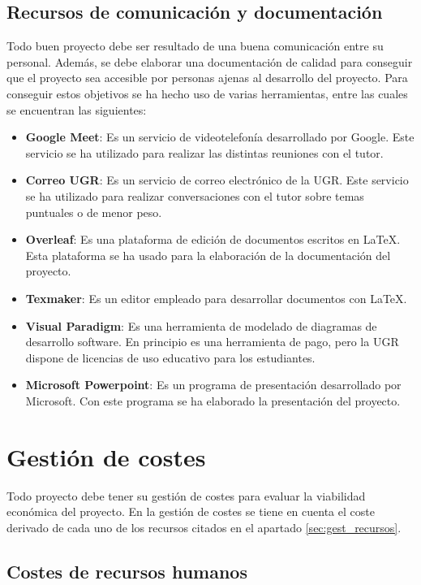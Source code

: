 \subsection{Recursos de comunicación y documentación} \label{subsec:recur_comu_docu}

Todo buen proyecto debe ser resultado de una buena comunicación entre su personal. Además, se debe elaborar una documentación de calidad para conseguir que el proyecto sea accesible por personas ajenas al desarrollo del proyecto. Para conseguir estos objetivos se ha hecho uso de varias herramientas, entre las cuales se encuentran las siguientes:

\begin{itemize}
\item \textbf{Google Meet}: Es un servicio de videotelefonía desarrollado por Google. Este servicio se ha utilizado para realizar las distintas reuniones con el tutor.
\item \textbf{Correo UGR}: Es un servicio de correo electrónico de la UGR. Este servicio se ha utilizado para realizar conversaciones con el tutor sobre temas puntuales o de menor peso.
\item \textbf{Overleaf}: Es una plataforma de edición de documentos escritos en LaTeX. Esta plataforma se ha usado para la elaboración de la documentación del proyecto.
\item \textbf{Texmaker}: Es un editor empleado para desarrollar documentos con LaTeX.
\item \textbf{Visual Paradigm}: Es una herramienta de modelado de diagramas de desarrollo software. En principio es una herramienta de pago, pero la UGR dispone de licencias de uso educativo para los estudiantes.
\item \textbf{Microsoft Powerpoint}: Es un programa de presentación desarrollado por Microsoft. Con este programa se ha elaborado la presentación del proyecto.
\end{itemize}



\section{Gestión de costes}

Todo proyecto debe tener su gestión de costes para evaluar la viabilidad económica del proyecto. En la gestión de costes se tiene en cuenta el coste derivado de cada uno de los recursos citados en el apartado \ref{sec:gest_recursos}.

\subsection{Costes de recursos humanos}

